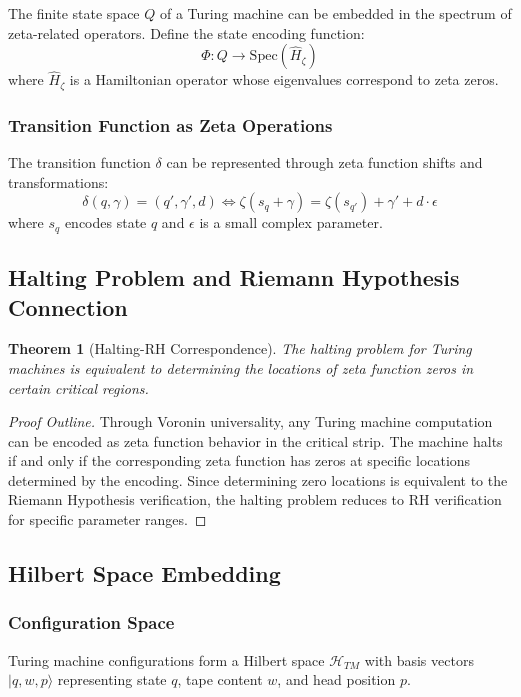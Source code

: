 \documentclass[12pt]{article}
\theoremstyle{plain}
\newtheorem{theorem}{Theorem}[section]
\theoremstyle{definition}
\newcommand{\cH}{\mathcal{H}}
\begin{document}
The finite state space $Q$ of a Turing machine can be embedded in the spectrum of zeta-related operators. Define the state encoding function:
$$\Phi: Q \to \text{Spec}(\hat{H}_\zeta)$$
where $\hat{H}_\zeta$ is a Hamiltonian operator whose eigenvalues correspond to zeta zeros.

\subsubsection{Transition Function as Zeta Operations}

The transition function $\delta$ can be represented through zeta function shifts and transformations:
$$\delta(q, \gamma) = (q', \gamma', d) \Leftrightarrow \zeta(s_q + \gamma) = \zeta(s_{q'}) + \gamma' + d \cdot \epsilon$$
where $s_q$ encodes state $q$ and $\epsilon$ is a small complex parameter.

\subsection{Halting Problem and Riemann Hypothesis Connection}

\begin{theorem}[Halting-RH Correspondence]
The halting problem for Turing machines is equivalent to determining the locations of zeta function zeros in certain critical regions.
\end{theorem}

\begin{proof}[Proof Outline]
Through Voronin universality, any Turing machine computation can be encoded as zeta function behavior in the critical strip. The machine halts if and only if the corresponding zeta function has zeros at specific locations determined by the encoding. Since determining zero locations is equivalent to the Riemann Hypothesis verification, the halting problem reduces to RH verification for specific parameter ranges.
\end{proof}

\subsection{Hilbert Space Embedding}

\subsubsection{Configuration Space}

Turing machine configurations form a Hilbert space $\cH_{TM}$ with basis vectors $|q, w, p\rangle$ representing state $q$, tape content $w$, and head position $p$.
\end{document}
